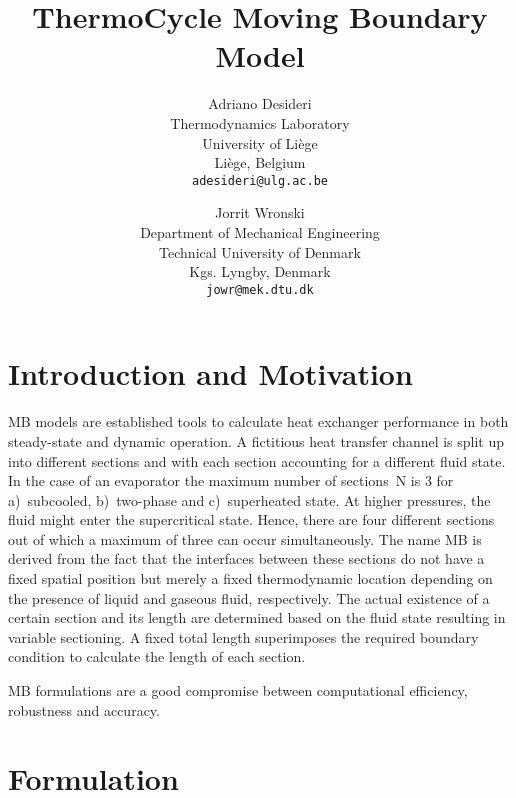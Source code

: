 \documentclass[11pt]{article} %
\title{ThermoCycle Moving Boundary Model}
\author{Adriano Desideri\\
\small Thermodynamics Laboratory\\[-0.8ex]
\small University of Li\`ege\\[-0.8ex]
\small Li\`ege, Belgium\\
\small \texttt{adesideri@ulg.ac.be}\\
\and
Jorrit Wronski\\
\small Department of Mechanical Engineering\\[-0.8ex]
\small Technical University of Denmark\\[-0.8ex]
\small Kgs. Lyngby, Denmark\\
\small \texttt{jowr@mek.dtu.dk}
}
\begin{document}

\maketitle


\section{Introduction and Motivation}

\Gls{MB} models are established tools to calculate heat exchanger performance in both steady-state and dynamic operation. A fictitious heat transfer channel is split up into different sections and with each section accounting for a different fluid state. In the case of an evaporator the maximum number of sections~\gls{N} is 3 for a)~subcooled, b)~two-phase and c)~superheated state. At higher pressures, the fluid might enter the supercritical state. Hence, there are four different sections out of which a maximum of three can occur simultaneously. The name \glsdesc{MB} is derived from the fact that the interfaces between these sections do not have a fixed spatial position but merely a fixed thermodynamic location depending on the presence of liquid and gaseous fluid, respectively. The actual existence of a certain section and its length are determined based on the fluid state resulting in variable sectioning. A fixed total length superimposes the required boundary condition to calculate the length of each section. 

\Glsdesc{MB} formulations are a good compromise between computational efficiency, robustness and accuracy\cite{Bendapudi2008}. 



\section{Formulation}
\end{document}
